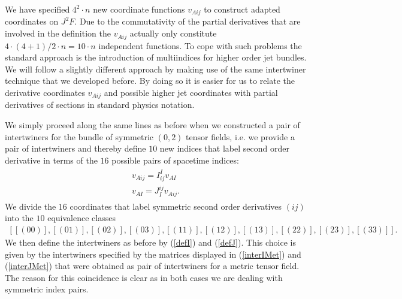 \documentclass[a4paper,12pt, DIV=14, BCOR=5mm, twoside, headsepline]{scrbook}
\begin{document}
We have specified $4^2\cdot n$ new coordinate functions $v_{Aij}$ to construct adapted coordinates on $J^2F$. Due to the commutativity of the partial derivatives that are involved in the definition the $v_{Aij}$ actually only constitute $4\cdot (4+1)/2 \cdot n = 10\cdot n$ independent functions. To cope with such problems the standard approach is the introduction of multiindices for higher order jet bundles. We will follow a slightly different approach by making use of the same intertwiner technique that we developed before. By doing so it is easier for us to relate the derivative coordinates $v_{Aij}$ and possible higher jet coordinates with partial derivatives of sections in standard physics notation. 

We simply proceed along the same lines as before when we constructed a pair of intertwiners for the bundle of symmetric $(0,2)$ tensor fields, i.e. we provide a pair of intertwiners and thereby define $10$ new indices that label second order derivative in terms of the $16$ possible pairs of spacetime indices:
\begin{align}
    \begin{aligned}
    v_{Aij} = I^I_{ij} v_{AI}\\
    v_{AI} = J_I^{ij} v_{Aij}.
    \end{aligned}
\end{align}
We divide the $16$ coordinates that label symmetric second order derivatives $(ij)$ into the $10$ equivalence classes 
\begin{align}
    \left [[(00)],[(01)],[(02)],[(03)],[(11)],[(12)],[(13)],[(22)],[(23)],[(33)] \right ].
\end{align}
We then define the intertwiners as before by (\ref{defI}) and (\ref{defJ}). 
This choice is given by the intertwiners specified by the matrices displayed in (\ref{interIMet}) and (\ref{interJMet}) that were obtained as pair of intertwiners for a metric tensor field. The reason for this coincidence is clear as in both cases we are dealing with symmetric index pairs. \\
\end{document}
